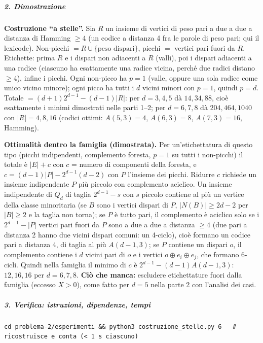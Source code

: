 \documentclass[11pt,a4paper]{article}
\begin{document}
\subparagraph{2. Dimostrazione}\label{dimostrazione}

\textbf{Costruzione ``a stelle''.} Sia \(R\) un insieme di vertici di
peso pari a due a due a distanza di Hamming \(\ge4\) (un codice a
distanza 4 fra le parole di peso pari; qui il lexicode). Non-picchi
\(=R\cup\{\text{peso dispari}\}\), picchi \(=\) vertici pari fuori da
\(R\). Etichette: prima \(R\) e i dispari non adiacenti a \(R\) (valli),
poi i dispari adiacenti a una radice (ciascuno ha esattamente una radice
vicina, perché due radici distano \(\ge4\)), infine i picchi. Ogni
non-picco ha \(p=1\) (valle, oppure una sola radice come unico vicino
minore); ogni picco ha tutti i \(d\) vicini minori con \(p=1\), quindi
\(p=d\). Totale \(=(d+1)2^{d-1}-(d-1)|R|\): per \(d=3,4,5\) dà
\(14,34,88\), cioè esattamente i minimi dimostrati nelle parti 1--2; per
\(d=6,7,8\) dà \(204,464,1040\) con \(|R|=4,8,16\) (codici ottimi:
\(A(5,3)=4\), \(A(6,3)=8\), \(A(7,3)=16\), Hamming).

\textbf{Ottimalità dentro la famiglia (dimostrata).} Per
un'etichettatura di questo tipo (picchi indipendenti, complemento
foresta, \(p=1\) su tutti i non-picchi) il totale è \(|E|+c\) con \(c\)
= numero di componenti della foresta, e \(c=(d-1)|P|-2^{d-1}(d-2)\) con
\(P\) l'insieme dei picchi. Ridurre \(c\) richiede un insieme
indipendente \(P\) più piccolo con complemento aciclico. Un insieme
indipendente di \(Q_d\) di taglia \(2^{d-1}-s\) con \(s\) piccolo
contiene al più un vertice della classe minoritaria (se \(B\) sono i
vertici dispari di \(P\), \(|N(B)|\ge 2d-2\) per \(|B|\ge2\) e la taglia
non torna); se \(P\) è tutto pari, il complemento è aciclico solo se i
\(2^{d-1}-|P|\) vertici pari fuori da \(P\) sono a due a due a distanza
\(\ge4\) (due pari a distanza 2 hanno due vicini dispari comuni: un
4-ciclo), cioè formano un codice pari a distanza 4, di taglia al più
\(A(d-1,3)\); se \(P\) contiene un dispari \(o\), il complemento
contiene i \(d\) vicini pari di \(o\) e i vertici
\(o\oplus e_i\oplus e_j\), che formano 6-cicli. Quindi nella famiglia il
minimo di \(c\) è \(2^{d-1}-(d-1)A(d-1,3)\): \(12,16,16\) per
\(d=6,7,8\). \textbf{Ciò che manca:} escludere etichettature fuori dalla
famiglia (eccesso \(X>0\)), come fatto per \(d=5\) nella parte 2 con
l'analisi dei casi.

\subparagraph{3. Verifica: istruzioni, dipendenze,
tempi}\label{verifica-istruzioni-dipendenze-tempi}

\begin{verbatim}
cd problema-2/esperimenti && python3 costruzione_stelle.py 6   # ricostruisce e conta (< 1 s ciascuno)
\end{verbatim}
\end{document}
